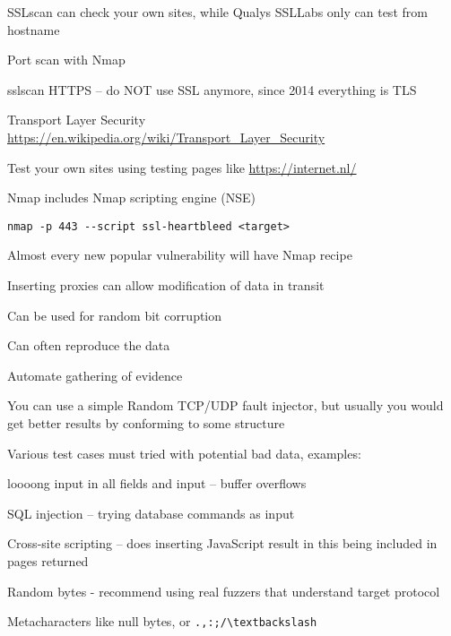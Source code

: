 \documentclass[Screen16to9,17pt]{foils}
\begin{document}
SSLscan can check your own sites, while Qualys SSLLabs only can test from hostname



\begin{list1}
\item Port scan with Nmap
\item sslscan HTTPS -- do NOT use SSL anymore, since 2014 everything is TLS
\item Transport Layer Security \url{https://en.wikipedia.org/wiki/Transport_Layer_Security}
\item Test your own sites using testing pages like \url{https://internet.nl/}
\end{list1}



Nmap includes Nmap scripting engine (NSE)


\begin{list1}
\item \verb+nmap -p 443 --script ssl-heartbleed <target>+\\
\item Almost every new popular vulnerability will have Nmap recipe
\end{list1}




\begin{list1}
\item Inserting proxies can allow modification of data in transit
\item Can be used for random bit corruption
\item Can often reproduce the data
\item Automate gathering of evidence
\item You can use a simple Random TCP/UDP fault injector, but usually you would get better results by conforming to some structure
\item Various test cases must tried with potential bad data, examples:
\begin{list2}
\item loooong input in all fields and input -- buffer overflows
\item SQL injection -- trying database commands as input
\item Cross-site scripting -- does inserting JavaScript result in this being included in pages returned
\item Random bytes - recommend using real fuzzers that understand target protocol
\item Metacharacters like null bytes, or \verb+.,:;/\textbackslash+
\end{list2}
\end{list1}
\end{document}
